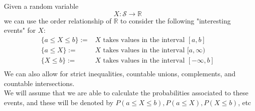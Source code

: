 \begin{defn}
    Given a random variable $$X: \mathcal{S} \longrightarrow \mathbb{R}$$
    we can use the order relationship of $\mathbb{R}$ to consider the following "interesting events" for $X$:
    \begin{eqnarray*}
        \{a \le X \le b\} :=& \text{$X$ takes values in the interval $[a, b]$}\\
        \{a \le X \} :=& \text{$X$ takes values in the interval $[a, \infty)$}\\
        \{ X \le b\} :=& \text{$X$ takes values in the interval $[-\infty, b]$}\\
    \end{eqnarray*}
    We can also allow for strict inequalities, countable unions, complements, and countable intersections. 
    \\
    We will assume that we are able to calculate the probabilities associated to these events, and these will be denoted by $P(a\le X \le b), P(a \le X), P(X \le b)$, etc
\end{defn}


